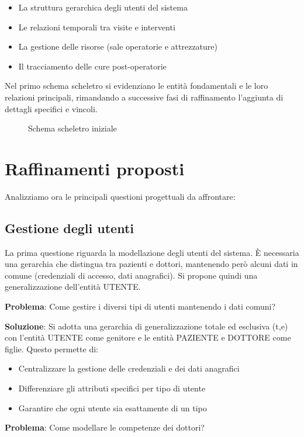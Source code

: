 \documentclass[12pt,a4paper]{report}
\begin{document}
\begin{itemize}
\item La struttura gerarchica degli utenti del sistema
\item Le relazioni temporali tra visite e interventi
\item La gestione delle risorse (sale operatorie e attrezzature)
\item Il tracciamento delle cure post-operatorie
\end{itemize}

Nel primo schema scheletro si evidenziano le entità fondamentali e le loro relazioni principali, rimandando a successive fasi di raffinamento l'aggiunta di dettagli specifici e vincoli.

\begin{figure}[H]
\caption{Schema scheletro iniziale}
\centering
\end{figure}

\section{Raffinamenti proposti}
Analizziamo ora le principali questioni progettuali da affrontare:

\subsection{Gestione degli utenti}
La prima questione riguarda la modellazione degli utenti del sistema. È necessaria una gerarchia che distingua tra pazienti e dottori, mantenendo però alcuni dati in comune (credenziali di accesso, dati anagrafici). Si propone quindi una generalizzazione dell'entità UTENTE.

\textbf{Problema}: Come gestire i diversi tipi di utenti mantenendo i dati comuni?

\textbf{Soluzione}: Si adotta una gerarchia di generalizzazione totale ed esclusiva (t,e) con l'entità UTENTE come genitore e le entità PAZIENTE e DOTTORE come figlie. Questo permette di:
\begin{itemize}
\item Centralizzare la gestione delle credenziali e dei dati anagrafici
\item Differenziare gli attributi specifici per tipo di utente
\item Garantire che ogni utente sia esattamente di un tipo
\end{itemize}

\textbf{Problema}: Come modellare le competenze dei dottori?
\end{document}
